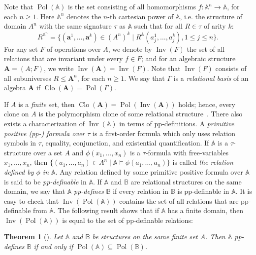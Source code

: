 \documentclass[12pt]{amsart}
\newtheorem{theorem}{Theorem}[section]
\theoremstyle{definition}
\theoremstyle{definition}
\newcommand{\struct}[1]{\mathbb{#1}}
\newcommand{\alg}[1]{\mathbf{#1}}
\newcommand{\algA}{\alg{A}}
\DeclareMathOperator{\Pol}{Pol}
\DeclareMathOperator{\Clo}{Clo}
\DeclareMathOperator{\Inv}{Inv}
\begin{document}
Note that $\Pol(\struct{A})$ is the set consisting of all homomorphisms $f\colon \struct{A}^n\to \struct{A}$, for each $n\geq 1$. Here $\struct{A}^n$ denotes the $n$-th cartesian power of $\struct{A}$, i.e. the structure of domain $A^n$ with the same signature $\tau$ as $\struct{A}$ such that for all $R \in \tau$ of arity $k$:
\[
R^{\struct{A}^n} = \{(\boldsymbol{a}^1,\dots,\boldsymbol{a}^k) \in (A^n)^{k} \mid R^{\struct{A}}(a_j^1,\dots,a_{j}^k) , 1 \leq j \leq n\}.
\]
For any set $F$ of operations over $A$, we denote by $\Inv(F)$ the set of all relations that are invariant under every $f\in F$; and for an algebraic structure $\algA = (A;F)$, we write $\Inv(\algA) = \Inv(F)$. Note that $\Inv(F)$ consists of all subuniverses $R \leq \algA^n$, for each $n\geq 1$. We say that $\Gamma$ is a \emph{relational basis} of an algebra $\algA$ if $\Clo(\algA) = \Pol(\Gamma)$.

If $A$ is a \emph{finite} set, then $\Clo(\algA) = \Pol(\Inv(\algA))$ holds; hence, every clone on $A$ is the polymorphism clone of some relational structure~\cite{BoKaKoRo,Geiger}. There also exists a characterization of $\Inv(\mathbb A)$ in terms of pp-definitions. 
A \emph{primitive positive (pp-) formula over $\tau$} is a first-order formula which only uses relation symbols in $\tau$, equality, conjunction, and existential quantification. If $\struct{A}$ is a $\tau$-structure over a set $A$ and $\phi(x_1,\dots,x_n)$ is a $\tau$-formula with free-variables $x_1,\dots,x_n$, then 
$\{(a_1,\dots,a_n) \in A^n\mid \struct{A} \models \phi(a_1,\dots,a_n)\}$
is called \emph{the relation defined by $\phi$ in $\struct{A}$}. 
Any relation defined by some primitive positive formula over $\struct{A}$ is said to be \emph{pp-definable} in $\struct{A}$. If $\struct{A}$ and $\mathbb B$ are relational structures on the same domain, we say that $\struct{A}$ \emph{pp-defines} $\struct{B}$ if every relation in $\struct{B}$ is pp-definable in $\struct{A}$. It is easy to check that $\Inv(\Pol(\struct{A}))$ contains the set of all relations that are pp-definable from $\struct{A}$. The following result shows that if $\struct{A}$ has a finite domain, then 
$\Inv(\Pol(\struct{A}))$ is equal to the set of pp-definable relations:

\begin{theorem}[\cite{BoKaKoRo,Geiger}]\label{thm:DefAndCloneInclusion}
Let $\struct{A}$ and $\struct{B}$ be structures on the same finite set $A$. Then $\struct{A}$ pp-defines $\struct{B}$ if and only if $\Pol(\struct{A})\subseteq\Pol(\struct{B})$.
\end{theorem}
\end{document}
